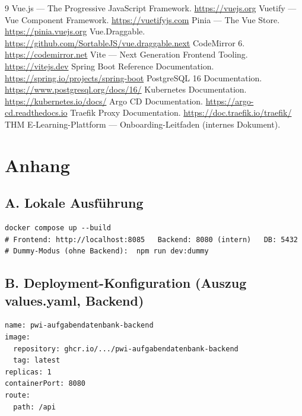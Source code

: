\documentclass[11pt,a4paper]{article}
\begin{document}
\begin{thebibliography}{9}
 Vue.js --- The Progressive JavaScript Framework. \url{https://vuejs.org}
 Vuetify --- Vue Component Framework. \url{https://vuetifyjs.com}
 Pinia --- The Vue Store. \url{https://pinia.vuejs.org}
 Vue.Draggable. \url{https://github.com/SortableJS/vue.draggable.next}
 CodeMirror 6. \url{https://codemirror.net}
 Vite --- Next Generation Frontend Tooling. \url{https://vitejs.dev}
 Spring Boot Reference Documentation. \url{https://spring.io/projects/spring-boot}
 PostgreSQL 16 Documentation. \url{https://www.postgresql.org/docs/16/}
 Kubernetes Documentation. \url{https://kubernetes.io/docs/}
 Argo CD Documentation. \url{https://argo-cd.readthedocs.io}
 Traefik Proxy Documentation. \url{https://doc.traefik.io/traefik/}
 THM E-Learning-Plattform --- Onboarding-Leitfaden (internes Dokument).
\end{thebibliography}

\newpage
\section*{Anhang}

\subsection*{A. Lokale Ausführung}
\begin{verbatim}
docker compose up --build
# Frontend: http://localhost:8085   Backend: 8080 (intern)   DB: 5432
# Dummy-Modus (ohne Backend):  npm run dev:dummy
\end{verbatim}

\subsection*{B. Deployment-Konfiguration (Auszug values.yaml, Backend)}
\begin{verbatim}
name: pwi-aufgabendatenbank-backend
image:
  repository: ghcr.io/.../pwi-aufgabendatenbank-backend
  tag: latest
replicas: 1
containerPort: 8080
route:
  path: /api
\end{verbatim}
\end{document}

